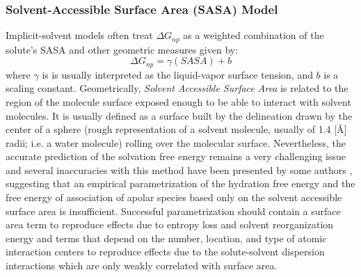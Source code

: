 \subsubsection{Solvent-Accessible Surface Area (SASA) Model}\label{subsubsec:SASA_model}
Implicit-solvent models often treat $\Delta G_{np}$ as a weighted combination of the solute’s SASA and other geometric measures given by: 
\begin{equation}
    \Delta G_{np} = \gamma (SASA) + b
    \label{eq:SASA}
\end{equation}
where $\gamma$ is is usually interpreted as the liquid-vapor surface tension, and $b$ is a scaling constant. Geometrically, \textit{Solvent Accessible Surface Area} is related to the region of the molecule surface exposed enough to be able to interact with solvent molecules. It is usually defined as a surface built by the delineation drawn by the center of a sphere (rough representation of a solvent molecule, usually of 1.4 [\r{A}] radii; i.e. a water molecule) rolling over the molecular surface. 
Nevertheless, the accurate prediction of the solvation free energy remains a very challenging issue and several inaccuracies with this method have been presented by some authors \cite{gallicchio2000enthalpy} \cite{wang2018breaking},  suggesting that an empirical parametrization of the hydration free energy and the free energy of association of apolar species based only on the solvent accessible surface area is insufficient. Successful parametrization should contain a surface area term to reproduce effects due to entropy loss and solvent reorganization energy and terms that depend on the number, location, and type of atomic interaction centers to reproduce effects due to the solute-solvent dispersion interactions which are only weakly correlated with surface area. 









